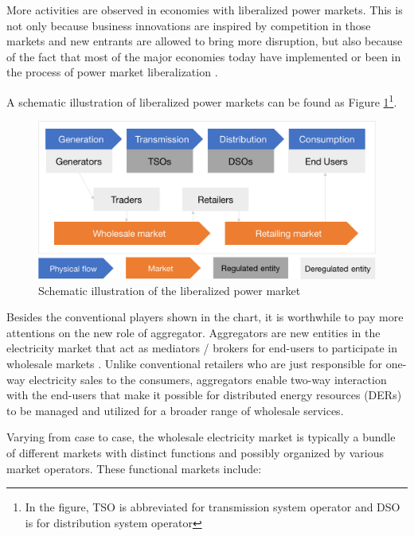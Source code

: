 More activities are observed in economies with liberalized power markets. This is not only because business innovations are inspired by competition in those markets and new entrants are allowed to bring more disruption, but also because of the fact that most of the major economies today have implemented or been in the process of power market liberalization \cite{Ranci2013,Vagliasindi2013}.

A schematic illustration of liberalized power markets can be found as Figure \ref{fig:PowerMarketSchematic}\footnote{In the figure, TSO is abbreviated for transmission system operator and DSO is for distribution system operator}.

\begin{figure}[h!]
	\centering
	\includegraphics[width=0.95\linewidth]{Figures/PowerMarketSchematic}
	\caption{Schematic illustration of the liberalized power market}
	\label{fig:PowerMarketSchematic}
\end{figure}

Besides the conventional players shown in the chart, it is worthwhile to pay more attentions on the new role of aggregator. Aggregators are new entities in the electricity market that act as mediators / brokers for end-users to participate in wholesale markets \cite{He2011,Gkatzikis2013,Rahnama2014,HenriquezAuba2017,Lipari2017}. Unlike conventional retailers who are just responsible for one-way electricity sales to the consumers, aggregators enable two-way interaction with the end-users that make it possible for distributed energy resources (DERs) to be managed and utilized for a broader range of wholesale services. 
 
Varying from case to case, the wholesale electricity market is typically a bundle of different markets with distinct functions and possibly organized by various market operators. These functional markets include:

